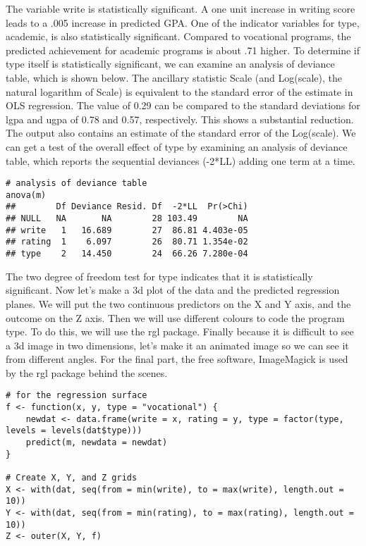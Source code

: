 The variable write is statistically significant. A one unit increase in writing score leads to a .005 increase in predicted GPA. One of the indicator variables for type, academic, is also statistically significant. Compared to vocational programs, the predicted achievement for academic programs is about .71 higher. To determine if type itself is statistically significant, we can examine an analysis of deviance table, which is shown below.
The ancillary statistic Scale (and Log(scale), the natural logarithm of Scale) is equivalent to the standard error of the estimate in OLS regression. The value of 0.29 can be compared to the standard deviations for lgpa and ugpa of 0.78 and 0.57, respectively. This shows a substantial reduction. The output also contains an estimate of the standard error of the Log(scale).
We can get a test of the overall effect of type by examining an analysis of deviance table, which reports the sequential deviances (-2*LL) adding one term at a time.
\begin{framed}
\begin{verbatim}
# analysis of deviance table
anova(m)
##        Df Deviance Resid. Df  -2*LL  Pr(>Chi)
## NULL   NA       NA        28 103.49        NA
## write   1   16.689        27  86.81 4.403e-05
## rating  1    6.097        26  80.71 1.354e-02
## type    2   14.450        24  66.26 7.280e-04
\end{verbatim}
\end{framed}
The two degree of freedom test for type indicates that it is statistically significant.
Now let's make a 3d plot of the data and the predicted regression planes. We will put the two continuous predictors on the X and Y axis, and the outcome on the Z axis. Then we will use different colours to code the program type. To do this, we will use the rgl package. Finally because it is difficult to see a 3d image in two dimensions, let's make it an animated image so we can see it from different angles. For the final part, the free software, ImageMagick is used by the rgl package behind the scenes.
\begin{framed}
\begin{verbatim}
# for the regression surface
f <- function(x, y, type = "vocational") {
    newdat <- data.frame(write = x, rating = y, type = factor(type, levels = levels(dat$type)))
    predict(m, newdata = newdat)
}

# Create X, Y, and Z grids
X <- with(dat, seq(from = min(write), to = max(write), length.out = 10))
Y <- with(dat, seq(from = min(rating), to = max(rating), length.out = 10))
Z <- outer(X, Y, f)
\end{verbatim}
\end{framed}
